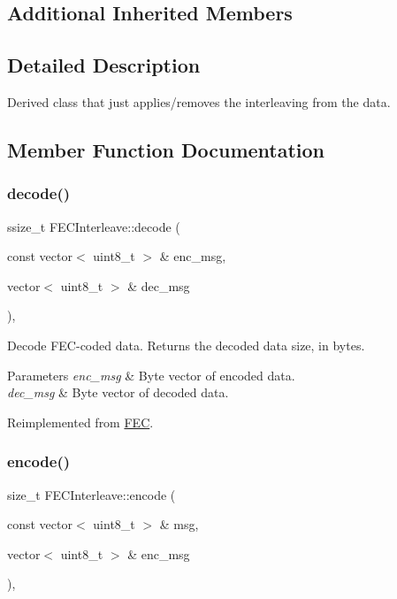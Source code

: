 \subsection*{Additional Inherited Members}


\subsection{Detailed Description}
Derived class that just applies/removes the interleaving from the data. 

\subsection{Member Function Documentation}
\mbox{\label{classFECInterleave_a7e45a890ff7061e0a5c3234d29ac8954}} 
\subsubsection{\texorpdfstring{decode()}{decode()}}
{\footnotesize\ttfamily ssize\+\_\+t F\+E\+C\+Interleave\+::decode (\begin{DoxyParamCaption}\item[{const vector$<$ uint8\+\_\+t $>$ \&}]{enc\+\_\+msg,  }\item[{vector$<$ uint8\+\_\+t $>$ \&}]{dec\+\_\+msg }\end{DoxyParamCaption})\hspace{0.3cm}{\ttfamily [inline]}, {\ttfamily [virtual]}}

Decode F\+E\+C-\/coded data. Returns the decoded data size, in bytes. 
\begin{DoxyParams}{Parameters}
{\em enc\+\_\+msg} & Byte vector of encoded data. \\
\hline
{\em dec\+\_\+msg} & Byte vector of decoded data. \\
\hline
\end{DoxyParams}


Reimplemented from \hyperlink{classFEC_aec87f2d9c2305283d226197bf76891cf}{F\+EC}.

\mbox{\label{classFECInterleave_a10d868d7b117193667d0406edec2ef59}} 
\subsubsection{\texorpdfstring{encode()}{encode()}}
{\footnotesize\ttfamily size\+\_\+t F\+E\+C\+Interleave\+::encode (\begin{DoxyParamCaption}\item[{const vector$<$ uint8\+\_\+t $>$ \&}]{msg,  }\item[{vector$<$ uint8\+\_\+t $>$ \&}]{enc\+\_\+msg }\end{DoxyParamCaption})\hspace{0.3cm}{\ttfamily [inline]}, {\ttfamily [virtual]}}

